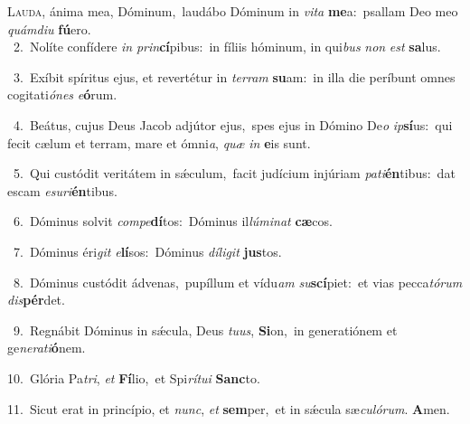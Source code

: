 \lettrine{\initial\textcolor{\initialcolor}{L}}{auda,} ánima mea, Dóminum,~\dagger laudábo Dóminum in \textit{vi}\-\textit{ta} \textbf{me}\-a:~\star psallam Deo meo \textit{quám}\-\textit{di}\textit{u} \textbf{fú}\-ero.\\
{\numbfont\textcolor{\numbcolor}{~2.}}~Nolíte confídere \textit{in} \textit{prin}\-\textbf{cí}pibus:~\star in fíliis hóminum, in qui\textit{bus} \textit{non} \textit{est} \textbf{sa}\-lus.\par
{\numbfont\textcolor{\numbcolor}{~3.}}~Exíbit spíritus ejus, et revertétur in \textit{ter}\-\textit{ram} \textbf{su}\-am:~\star in illa die períbunt omnes cogitati\-\textit{ó}\-\textit{nes} \textit{e}\-\textbf{ó}rum.\par
{\numbfont\textcolor{\numbcolor}{~4.}}~Beátus, cujus Deus Jacob adjútor ejus,~\dagger spes ejus in Dómino De\textit{o} \textit{ip}\-\textbf{sí}us:~\star qui fecit cælum et terram, mare et ómni\-\textit{a}\-, \textit{quæ} \textit{in} \textbf{e}\-is sunt.\par
{\numbfont\textcolor{\numbcolor}{~5.}}~Qui custódit veritátem in sǽculum,~\dagger facit judícium injúriam \textit{pa}\-\textit{ti}\textbf{én}tibus:~\star dat escam \textit{e}\-\textit{su}\textit{ri}\textbf{én}tibus.\par
{\numbfont\textcolor{\numbcolor}{~6.}}~Dóminus solvit \textit{com}\-\textit{pe}\textbf{dí}tos:~\star Dóminus il\-\textit{lú}\-\textit{mi}\textit{nat} \textbf{cæ}\-cos.\par
{\numbfont\textcolor{\numbcolor}{~7.}}~Dóminus éri\textit{git} \textit{e}\-\textbf{lí}sos:~\star Dóminus \textit{dí}\-\textit{li}\textit{git} \textbf{jus}\-tos.\par
{\numbfont\textcolor{\numbcolor}{~8.}}~Dóminus custódit ádvenas,~\dagger pupíllum et vídu\textit{am} \textit{su}\-\textbf{scí}piet:~\star et vias pecca\-\textit{tó}\-\textit{rum} \textit{dis}\-\textbf{pér}det.\par
{\numbfont\textcolor{\numbcolor}{~9.}}~Regnábit Dóminus in sǽcula, Deus \textit{tu}\-\textit{us}, \textbf{Si}\-on,~\star in generatiónem et ge\-\textit{ne}\-\textit{ra}\textit{ti}\textbf{ó}nem.\par
{\numbfont\textcolor{\numbcolor}{10.}}~Glória Pa\-\textit{tri}\-, \textit{et} \textbf{Fí}\-lio,~\star et Spi\-\textit{rí}\-\textit{tu}\textit{i} \textbf{Sanc}\-to.\par
{\numbfont\textcolor{\numbcolor}{11.}}~Sicut erat in princípio, et \textit{nunc}\-, \textit{et} \textbf{sem}\-per,~\star et in sǽcula sæ\-\textit{cu}\-\textit{ló}\textit{rum}. \textbf{A}\-men.\par
